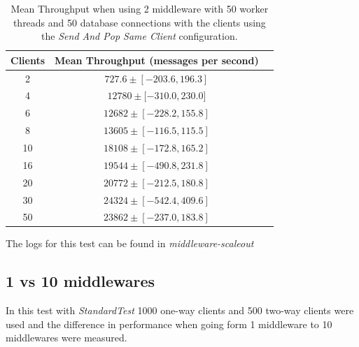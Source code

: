 \documentclass{article}
\begin{document}
                \begin{table}[H]
                    \centering
                    \begin{tabular}{|c|c|c|}
                        \hline 
                        \textbf{Clients} & \textbf{Mean Throughput} (messages per second)\\ 
                        \hline 
                        2 & $727.6 \pm [-203.6,  196.3]$\\                         \hline 
                        4 & $12780 \pm  [-310.0,    230.0$]\\                         \hline 
                        6 & $12682  \pm [-228.2,    155.8]$\\                         \hline 
                        8 & $13605 \pm  [-116.5,    115.5]$\\                         \hline 
                        10 & $18108  \pm [-172.8,    165.2]$\\                        \hline 
                        16 & $19544 \pm  [-490.8,    231.8]$\\                        \hline 
                        20 & $20772 \pm  [-212.5,    180.8]$\\                        \hline 
                        30 & $24324 \pm  [-542.4,    409.6]$\\                        \hline 
                        50 & $23862  \pm [-237.0,    183.8]$\\                        \hline 
                    \end{tabular}
                    \caption{Mean Throughput when using 2 middleware with 50 worker threads and 50 database connections with the clients using the \textit{Send And Pop Same Client} configuration.}
                    \label{table:throughput_2_middleware}
                \end{table} 


        The logs for this test can be found in \textit{middleware-scaleout}

        \subsection{1 vs 10 middlewares}    
            In this test with \textit{StandardTest} 1000 one-way clients and 500 two-way clients were used and the difference in performance when going form 1 middleware to 10 middlewares were measured.
            
\end{document}
